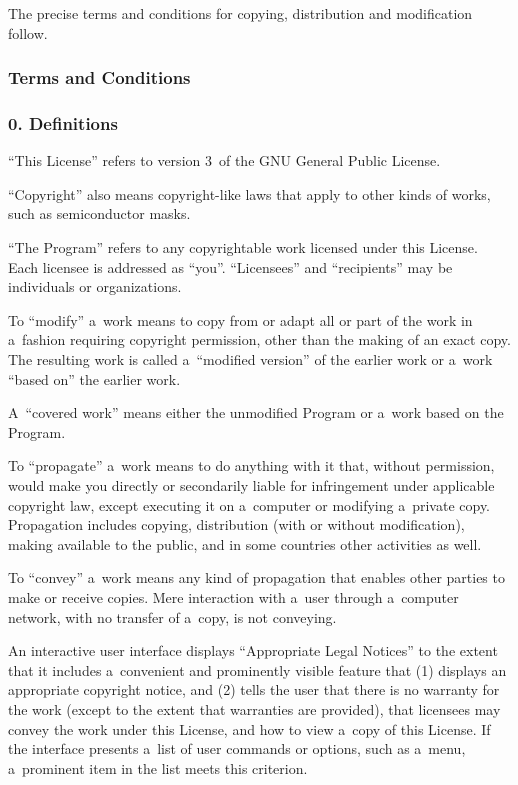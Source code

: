 \documentclass[a4paper, 11pt, twoside]{article}
\begin{document}
The precise terms and conditions for copying, distribution and modification follow.

\subsubsection{Terms and Conditions}

\subsubsection{0. Definitions}

“This License” refers to version 3~of the GNU General Public License.

“Copyright” also means copyright-like laws that apply to other kinds of works, such as semiconductor masks.

“The Program” refers to any copyrightable work licensed under this License. Each licensee is addressed as “you”. “Licensees” and “recipients” may be individuals or organizations.

To “modify” a~work means to copy from or adapt all or part of the work in a~fashion requiring copyright permission, other than the making of an exact copy. The resulting work is called a~“modified version” of the earlier work or a~work “based on” the earlier work.

A~“covered work” means either the unmodified Program or a~work based on the Program.

To “propagate” a~work means to do anything with it that, without permission, would make you directly or secondarily liable for infringement under applicable copyright law, except executing it on a~computer or modifying a~private copy. Propagation includes copying, distribution (with or without modification), making available to the public, and in some countries other activities as well.

To “convey” a~work means any kind of propagation that enables other parties to make or receive copies. Mere interaction with a~user through a~computer network, with no transfer of a~copy, is not conveying.

An interactive user interface displays “Appropriate Legal Notices” to the extent that it includes a~convenient and prominently visible feature that (1) displays an appropriate copyright notice, and (2) tells the user that there is no warranty for the work (except to the extent that warranties are provided), that licensees may convey the work under this License, and how to view a~copy of this License. If the interface presents a~list of user commands or options, such as a~menu, a~prominent item in the list meets this criterion.
\end{document}

